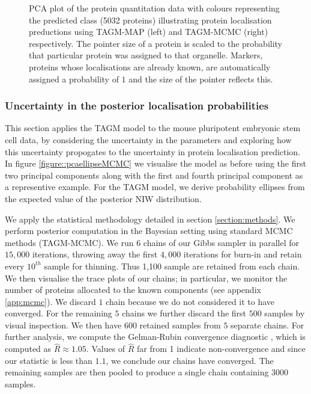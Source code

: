 \documentclass[12pt,english]{article}\usepackage[]{graphicx}\usepackage[]{color}
\newenvironment{knitrout}{}{} %
\begin{document}
\begin{figure}[ht]
\begin{subfigure}[t]{0.5\textwidth}
\begin{knitrout}
\end{knitrout}
    \end{subfigure}%
  \centering
  \caption{PCA plot of the protein quantitation data with colours
    representing the predicted class (5032 proteins) illustrating
    protein localisation preductions using TAGM-MAP (left) and
    TAGM-MCMC (right) respectively. The pointer size of a protein is
    scaled to the probability that particular protein was assigned to
    that organelle. Markers, proteins whose localisations are already
    known, are automatically assigned a probability of $1$ and the
    size of the pointer reflects this.}
  \label{fig:assignmentPCA} %
\end{figure}


\subsubsection{Uncertainty in the posterior localisation probabilities}

This section applies the TAGM model to the mouse pluripotent embryonic
stem cell data, by considering the uncertainty in the parameters and
exploring how this uncertainty propogates to the uncertainty in
protein localisation prediction.  In figure
\ref{figure::pcaellipseMCMC} we visualise the model as before using
the first two principal components along with the first and fourth
principal component as a representive example.  For the TAGM model, we
derive probability ellipses from the expected value of the posterior
NIW distribution.

We apply the statistical methodology detailed in section
\ref{section:methods}.  We perform posterior computation in the
Bayesian setting using standard MCMC methods (TAGM-MCMC).  We run $6$
chains of our Gibbs sampler in parallel for $15,000$ iterations,
throwing away the first $4,000$ iterations for burn-in and retain
every $10^{th}$ sample for thinning.  Thus 1,100 sample are retained
from each chain. We then visualise the trace plots of our chains; in
particular, we monitor the number of proteins allocated to the known
components (see appendix \ref{app:mcmc}). We discard $1$ chain because
we do not considered it to have converged.  For the remaining $5$
chains we further discard the first $500$ samples by visual
inspection.  We then have $600$ retained samples from $5$ separate
chains. For further analysis, we compute the Gelman-Rubin convergence
diagnostic \citep{Gelman:1992, Brooks:1998}, which is computed as
$\hat{R} \approx 1.05$.  Values of $\hat{R}$ far from 1 indicate
non-convergence and since our statistic is less than $1.1$, we
conclude our chains have converged. The remaining samples are then
pooled to produce a single chain containing $3000$ samples.
\end{document}
